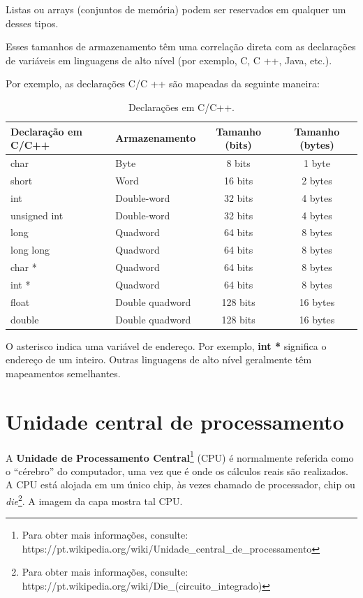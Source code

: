 Listas ou arrays (conjuntos de memória) podem ser reservados em qualquer um desses tipos.

Esses tamanhos de armazenamento têm uma correlação direta com as declarações de variáveis em linguagens de alto nível (por exemplo, C, C ++, Java, etc.).

Por exemplo, as declarações C/C ++ são mapeadas da seguinte maneira:
\begin{table}[h]
	\centering
	\begin{tabular}{|l|l|c|c|}
		\hline
		\rowcolor[HTML]{C0C0C0} 
		{\color[HTML]{000000} } Declaração em C/C++ & {\color[HTML]{000000} Armazenamento} & {\color[HTML]{000000} Tamanho (bits)} & {\color[HTML]{000000} Tamanho (bytes)} \\ \hline
		char & Byte& 8 bits & 1 byte\\ \hline
		short & Word & 16 bits & 2 bytes\\ \hline
		int & Double-word & 32 bits & 4 bytes\\ \hline
		unsigned int & Double-word & 32 bits & 4 bytes\\ \hline
		long\footnotemark & Quadword & 64 bits & 8 bytes\\ \hline
		long long  & Quadword & 64 bits & 8 bytes\\ \hline
		char *  & Quadword & 64 bits & 8 bytes\\ \hline
		int * & Quadword & 64 bits & 8 bytes\\ \hline
		float & Double quadword & 128 bits & 16 bytes  \\ \hline
		double & Double quadword & 128 bits & 16 bytes  \\ \hline
	\end{tabular}

	\caption{Declarações em C/C++.}
	\label{tab:declaracoesemC}
\end{table}

O asterisco indica uma variável de endereço. Por exemplo, \textbf{int *} significa o endereço de um inteiro. Outras linguagens de alto nível geralmente têm mapeamentos semelhantes.

\section{Unidade central de processamento}
A \textbf{Unidade de Processamento Central}\footnote{Para obter mais informações, consulte: https://pt.wikipedia.org/wiki/Unidade\_central\_de\_processamento} (CPU) é normalmente referida como o ``cérebro'' do computador, uma vez que é onde os cálculos reais são realizados. A CPU está alojada em um único chip, às vezes chamado de processador, chip ou \textit{die}\footnote{Para obter mais informações, consulte: https://pt.wikipedia.org/wiki/Die\_(circuito\_integrado)}. A imagem da capa mostra tal CPU.


